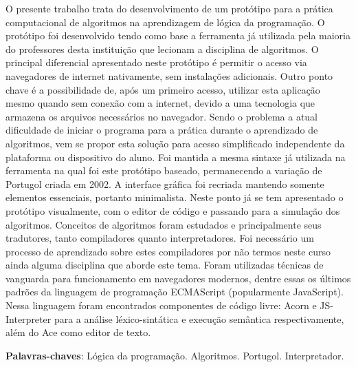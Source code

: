 \begin{resumo}
O presente trabalho trata do desenvolvimento de um protótipo para a prática computacional de algoritmos na aprendizagem de lógica da programação. O protótipo foi desenvolvido tendo como base a ferramenta já utilizada pela maioria do professores desta instituição que lecionam a disciplina de algoritmos. O principal diferencial apresentado neste protótipo é permitir o acesso via navegadores de internet nativamente, sem instalações adicionais. Outro ponto chave é a possibilidade de, após um primeiro acesso, utilizar esta aplicação mesmo quando sem conexão com a internet, devido a uma tecnologia que armazena os arquivos necessários no navegador. Sendo o problema a atual dificuldade de iniciar o programa para a prática durante o aprendizado de algoritmos, vem se propor esta solução para acesso simplificado independente da plataforma ou dispositivo do aluno. Foi mantida a mesma sintaxe já utilizada na ferramenta na qual foi este protótipo baseado, permanecendo a variação de Portugol criada em 2002. A interface gráfica foi recriada mantendo somente elementos essenciais, portanto minimalista. Neste ponto já se tem apresentado o protótipo visualmente, com o editor de código e passando para a simulação dos algoritmos. Conceitos de algoritmos foram estudados e principalmente seus tradutores, tanto compiladores quanto interpretadores. Foi necessário um processo de aprendizado sobre estes compiladores por não termos neste curso ainda alguma disciplina que aborde este tema. Foram utilizadas técnicas de vanguarda para funcionamento em navegadores modernos, dentre essas os últimos padrões da linguagem de programação ECMAScript (popularmente JavaScript). Nessa linguagem foram encontrados componentes de código livre: Acorn e JS-Interpreter para a análise léxico-sintática e execução semântica respectivamente, além do Ace como editor de texto.

\vspace{\onelineskip}
\textbf{Palavras-chaves}: Lógica da programação. Algoritmos. Portugol. Interpretador.
\end{resumo}

%
